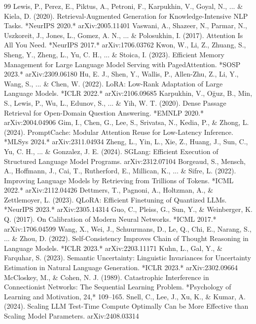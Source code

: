 \documentclass[10pt,twocolumn]{article}
\begin{document}
\begin{thebibliography}{99}
   Lewis, P., Perez, E., Piktus, A., Petroni, F., Karpukhin, V., Goyal, N., ... \& Kiela, D. (2020). Retrieval-Augmented Generation for Knowledge-Intensive NLP Tasks. *NeurIPS 2020.* arXiv:2005.11401
   Vaswani, A., Shazeer, N., Parmar, N., Uszkoreit, J., Jones, L., Gomez, A. N., ... \& Polosukhin, I. (2017). Attention Is All You Need. *NeurIPS 2017.* arXiv:1706.03762
   Kwon, W., Li, Z., Zhuang, S., Sheng, Y., Zheng, L., Yu, C. H., ... \& Stoica, I. (2023). Efficient Memory Management for Large Language Model Serving with PagedAttention. *SOSP 2023.* arXiv:2309.06180
   Hu, E. J., Shen, Y., Wallis, P., Allen-Zhu, Z., Li, Y., Wang, S., ... \& Chen, W. (2022). LoRA: Low-Rank Adaptation of Large Language Models. *ICLR 2022.* arXiv:2106.09685
   Karpukhin, V., O\u{g}uz, B., Min, S., Lewis, P., Wu, L., Edunov, S., ... \& Yih, W. T. (2020). Dense Passage Retrieval for Open-Domain Question Answering. *EMNLP 2020.* arXiv:2004.04906
   Gim, I., Chen, G., Lee, S., Srivatsa, N., Kedia, P., \& Zhong, L. (2024). PromptCache: Modular Attention Reuse for Low-Latency Inference. *MLSys 2024.* arXiv:2311.04934
   Zheng, L., Yin, L., Xie, Z., Huang, J., Sun, C., Yu, C. H., ... \& Gonzalez, J. E. (2024). SGLang: Efficient Execution of Structured Language Model Programs. arXiv:2312.07104
   Borgeaud, S., Mensch, A., Hoffmann, J., Cai, T., Rutherford, E., Millican, K., ... \& Sifre, L. (2022). Improving Language Models by Retrieving from Trillions of Tokens. *ICML 2022.* arXiv:2112.04426
   Dettmers, T., Pagnoni, A., Holtzman, A., \& Zettlemoyer, L. (2023). QLoRA: Efficient Finetuning of Quantized LLMs. *NeurIPS 2023.* arXiv:2305.14314
   Guo, C., Pleiss, G., Sun, Y., \& Weinberger, K. Q. (2017). On Calibration of Modern Neural Networks. *ICML 2017.* arXiv:1706.04599
   Wang, X., Wei, J., Schuurmans, D., Le, Q., Chi, E., Narang, S., ... \& Zhou, D. (2022). Self-Consistency Improves Chain of Thought Reasoning in Language Models. *ICLR 2023.* arXiv:2203.11171
   Kuhn, L., Gal, Y., \& Farquhar, S. (2023). Semantic Uncertainty: Linguistic Invariances for Uncertainty Estimation in Natural Language Generation. *ICLR 2023.* arXiv:2302.09664
   McCloskey, M., \& Cohen, N. J. (1989). Catastrophic Interference in Connectionist Networks: The Sequential Learning Problem. *Psychology of Learning and Motivation, 24,* 109--165.
   Snell, C., Lee, J., Xu, K., \& Kumar, A. (2024). Scaling LLM Test-Time Compute Optimally Can be More Effective than Scaling Model Parameters. arXiv:2408.03314

\end{thebibliography}
\end{document}
